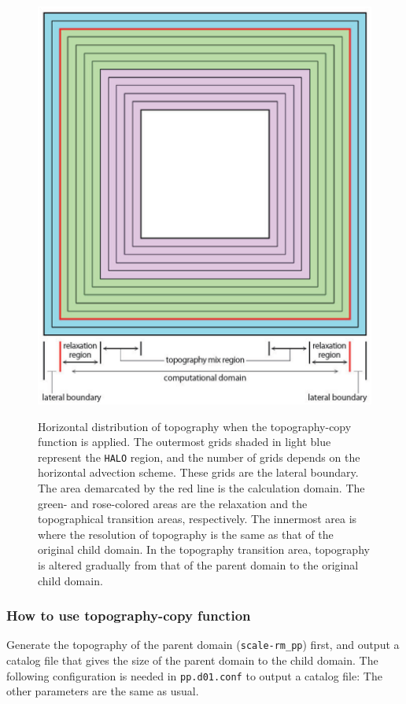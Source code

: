 \begin{figure}[tbh]
\begin{center}
  \includegraphics[width=0.4\hsize]{./figure/topo_copy.eps}\\
  \caption{Horizontal distribution of topography when the topography-copy function is applied.
    The outermost grids shaded in light blue represent the \texttt{HALO} region, and the number of grids depends on
    the horizontal advection scheme. 
    These grids are the lateral boundary. The area demarcated by the red line is the calculation domain.
    The green- and rose-colored areas are the relaxation and the topographical transition areas, respectively.
    The innermost area is where the resolution of topography is the same as that of the original child domain.
    In the topography transition area, topography is altered gradually from that of 
    the parent domain to the original child domain.
}
  \label{fig_topocopy}
\end{center}
\end{figure}



\subsubsection{How to use topography-copy function}

Generate the topography of the parent domain (\verb|scale-rm_pp|) first, and output a catalog file that gives the size of the parent domain to the child domain. The following configuration is needed in \verb|pp.d01.conf| to output a catalog file:
The other parameters are the same as usual. 

